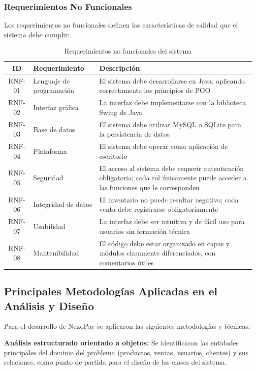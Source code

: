 \documentclass[12pt,a4paper]{report}
\begin{document}
\subsubsection{Requerimientos No Funcionales}

Los requerimientos no funcionales definen las características de calidad que el sistema debe cumplir:

\begin{table}[H]
\centering
\caption{Requerimientos no funcionales del sistema}
\label{tab:req_no_funcionales}
\begin{tabular}{|c|p{3.5cm}|p{8.5cm}|}
\hline
\textbf{ID} & \textbf{Requerimiento} & \textbf{Descripción} \\ \hline
RNF-01 & Lenguaje de programación & El sistema debe desarrollarse en Java, aplicando correctamente los principios de POO \\ \hline
RNF-02 & Interfaz gráfica & La interfaz debe implementarse con la biblioteca Swing de Java \\ \hline
RNF-03 & Base de datos & El sistema debe utilizar MySQL o SQLite para la persistencia de datos \\ \hline
RNF-04 & Plataforma & El sistema debe operar como aplicación de escritorio \\ \hline
RNF-05 & Seguridad & El acceso al sistema debe requerir autenticación obligatoria; cada rol únicamente puede acceder a las funciones que le corresponden \\ \hline
RNF-06 & Integridad de datos & El inventario no puede resultar negativo; cada venta debe registrarse obligatoriamente \\ \hline
RNF-07 & Usabilidad & La interfaz debe ser intuitiva y de fácil uso para usuarios sin formación técnica \\ \hline
RNF-08 & Mantenibilidad & El código debe estar organizado en capas y módulos claramente diferenciados, con comentarios útiles \\ \hline
\end{tabular}
\end{table}

\subsection{Principales Metodologías Aplicadas en el Análisis y Diseño}

Para el desarrollo de NexoPay se aplicaron las siguientes metodologías y técnicas:

\textbf{Análisis estructurado orientado a objetos:} Se identificaron las entidades principales del dominio del problema (productos, ventas, usuarios, clientes) y sus relaciones, como punto de partida para el diseño de las clases del sistema.
\end{document}

